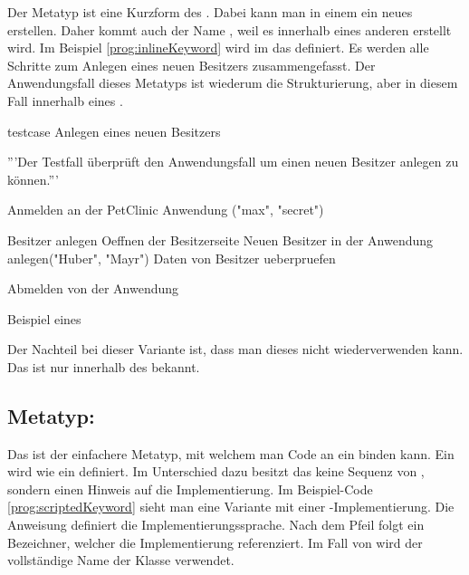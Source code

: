 Der Metatyp  ist eine Kurzform des . Dabei kann man in einem  ein neues  erstellen. Daher kommt auch der Name , weil es innerhalb eines anderen  erstellt wird. Im Beispiel \ref{prog:inlineKeyword} wird im   das   definiert. Es werden alle Schritte zum Anlegen eines neuen Besitzers zusammengefasst. Der Anwendungsfall dieses Metatyps ist wiederum die Strukturierung, aber in diesem Fall innerhalb eines . 

\begin{program}
\begin{JavaCode}
testcase Anlegen eines neuen Besitzers {
	'''Der Testfall überprüft den Anwendungsfall um einen 
	   neuen Besitzer anlegen zu können.'''
	
	Anmelden an der PetClinic Anwendung ("max", "secret")
	
	Besitzer anlegen {
		Oeffnen der Besitzerseite		
		Neuen Besitzer in der Anwendung anlegen("Huber", "Mayr")
		Daten von Besitzer ueberpruefen
	}
	
	Abmelden von der Anwendung
}
\end{JavaCode}
\caption{Beispiel eines }
\label{prog:inlineKeyword}
\end{program}

\SuperPar
Der Nachteil bei dieser Variante ist, dass man dieses  nicht wiederverwenden kann. Das  ist nur innerhalb des  bekannt.


\subsection{Metatyp: }

Das  ist der einfachere Metatyp, mit welchem man Code an ein  binden kann. Ein  wird wie ein  definiert. Im Unterschied dazu besitzt das  keine Sequenz von , sondern einen Hinweis auf die Implementierung. Im Beispiel-Code \ref{prog:scriptedKeyword} sieht man eine Variante mit einer -Implementierung. Die Anweisung  definiert die Implementierungssprache. Nach dem Pfeil folgt ein Bezeichner, welcher die Implementierung referenziert. Im Fall von  wird der vollständige Name der Klasse verwendet.

